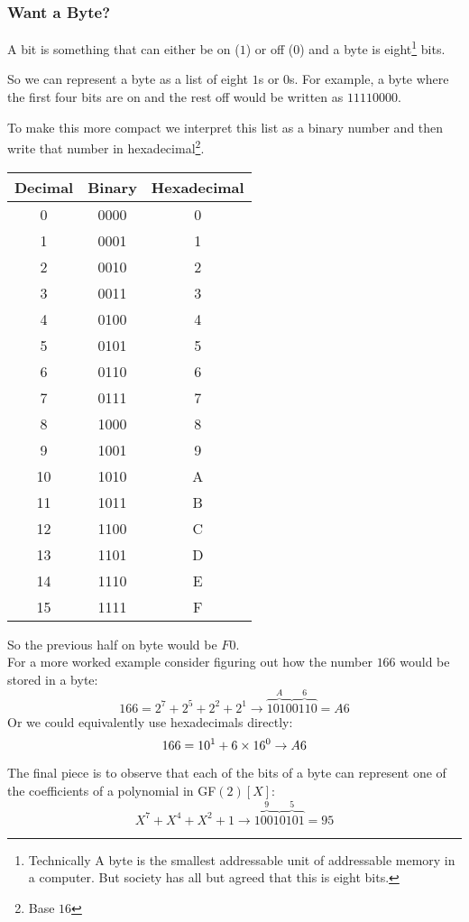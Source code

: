 \subsubsection{Want a Byte?}
A bit is something that can either be on ($1$) or off ($0$) and a byte is eight\footnote{
	Technically A byte is the smallest addressable unit of addressable memory in a computer.
	But society has all but agreed that this is eight bits.
	}
	bits. 

So we can represent a byte as a list of eight $1$s or $0$s.
For example,
a byte where the first four bits are on and the rest off would be written as $11110000$.

To make this more compact we interpret this list as a binary number and then write that number in hexadecimal\footnote{Base $16$}.
\begin{center}
\begin{tabular}{|c|cc|}
	\hline
	Decimal&Binary&Hexadecimal\\
	\hline
	0&0000&0\\
	1&0001&1\\
	2&0010&2\\
	3&0011&3\\
	4&0100&4\\
	5&0101&5\\
	6&0110&6\\
	7&0111&7\\
	8&1000&8\\
	9&1001&9\\
	10&1010&A\\
	11&1011&B\\
	12&1100&C\\
	13&1101&D\\
	14&1110&E\\
	15&1111&F\\
	\hline
\end{tabular}
\end{center}
So the previous half on byte would be $F0$.
\\

For a more worked example consider figuring out how the number $166$ would be stored in a byte:
\[166 = 2^7+2^5+2^2+2^1 \rightarrow \overbrace{1010}^A\overbrace{0110}^6 = A6\]
Or we could equivalently use hexadecimals directly:
\[166 =  10\time16^1+6\times16^0 \rightarrow A6\]

The final piece is to observe that each of the bits of a byte can represent one of the coefficients of a polynomial in GF$(2)[X]$:
\[X^7+X^4+X^2+1 \rightarrow \overbrace{1001}^9\overbrace{0101}^5 = 95\]


